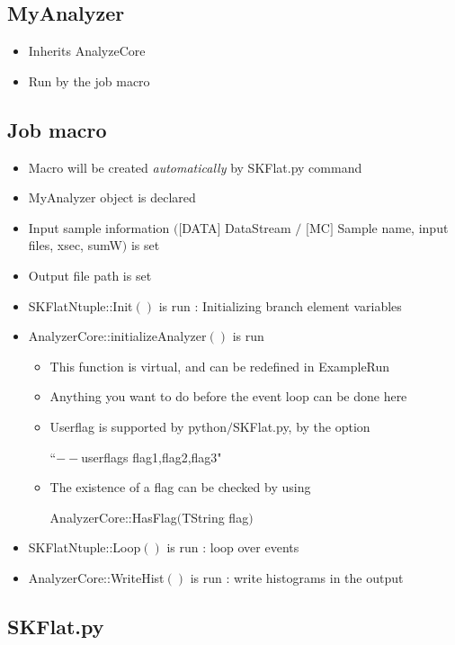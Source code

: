 \documentclass[12pt, a4paper, titlepage]{article}
\begin{document}
\subsection{MyAnalyzer}

\begin{itemize}
\item Inherits AnalyzeCore
\item Run by the job macro
\end{itemize}

\subsection{Job macro}

\begin{itemize}
\item Macro will be created \textit{automatically} by SKFlat$.$py command
\item MyAnalyzer object is declared
\item Input sample information $([$DATA$]$ DataStream $/$ $[$MC$]$ Sample name, input files, xsec, sumW$)$ is set
\item Output file path is set
\item SKFlatNtuple::Init$()$ is run :
Initializing branch element variables
\item AnalyzerCore::initializeAnalyzer$()$ is run
\begin{itemize}
\item This function is virtual, and can be redefined in ExampleRun
\item Anything you want to do before the event loop can be done here
\item Userflag is supported by python$/$SKFlat$.$py, by the option \par ``$--$userflags flag1,flag2,flag3"
\item The existence of a flag can be checked by using \par AnalyzerCore::HasFlag$($TString flag$)$
\end{itemize}
\item SKFlatNtuple::Loop$()$ is run : loop over events
\item AnalyzerCore::WriteHist$()$ is run : write histograms in the output
\end{itemize}

\subsection{SKFlat.py}
\end{document}
